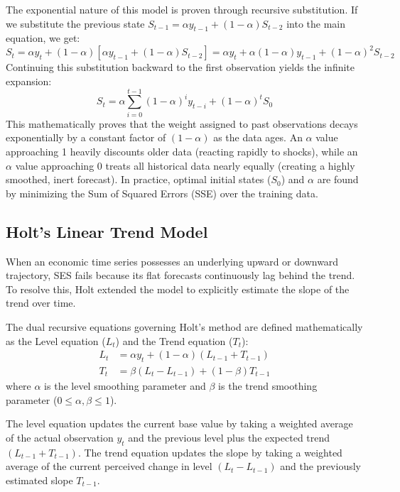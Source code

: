 \documentclass[11pt, a4paper]{report}
\begin{document}
The exponential nature of this model is proven through recursive substitution. If we substitute the previous state $S_{t-1} = \alpha y_{t-1} + (1 - \alpha)S_{t-2}$ into the main equation, we get:
\begin{equation}
    S_t = \alpha y_t + (1 - \alpha)[\alpha y_{t-1} + (1 - \alpha)S_{t-2}] = \alpha y_t + \alpha(1-\alpha)y_{t-1} + (1-\alpha)^2 S_{t-2}
\end{equation}
Continuing this substitution backward to the first observation yields the infinite expansion:
\begin{equation}
    S_t = \alpha \sum_{i=0}^{t-1} (1-\alpha)^i y_{t-i} + (1-\alpha)^t S_0
\end{equation}
This mathematically proves that the weight assigned to past observations decays exponentially by a constant factor of $(1-\alpha)$ as the data ages. An $\alpha$ value approaching 1 heavily discounts older data (reacting rapidly to shocks), while an $\alpha$ value approaching 0 treats all historical data nearly equally (creating a highly smoothed, inert forecast). In practice, optimal initial states ($S_0$) and $\alpha$ are found by minimizing the Sum of Squared Errors (SSE) over the training data.

\subsection{Holt's Linear Trend Model}
When an economic time series possesses an underlying upward or downward trajectory, SES fails because its flat forecasts continuously lag behind the trend. To resolve this, Holt extended the model to explicitly estimate the slope of the trend over time.

The dual recursive equations governing Holt's method are defined mathematically as the Level equation ($L_t$) and the Trend equation ($T_t$):
\begin{align}
    L_t &= \alpha y_t + (1 - \alpha)(L_{t-1} + T_{t-1}) \\
    T_t &= \beta (L_t - L_{t-1}) + (1 - \beta)T_{t-1}
\end{align}
where $\alpha$ is the level smoothing parameter and $\beta$ is the trend smoothing parameter ($0 \le \alpha, \beta \le 1$). 

The level equation updates the current base value by taking a weighted average of the actual observation $y_t$ and the previous level plus the expected trend $(L_{t-1} + T_{t-1})$. The trend equation updates the slope by taking a weighted average of the current perceived change in level $(L_t - L_{t-1})$ and the previously estimated slope $T_{t-1}$.
\end{document}
